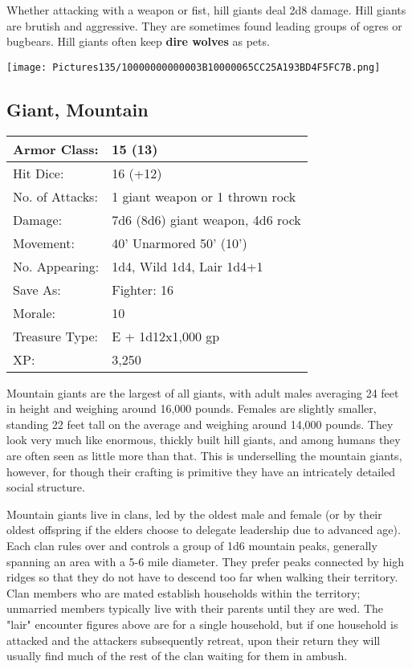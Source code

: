 \documentclass[a4paper,twoside,openany,10pt]{book}
\begin{document}
\begin{multicols}{2}
Whether attacking with a weapon or fist, hill giants deal 2d8 damage. Hill giants are brutish and aggressive. They are sometimes found leading groups of ogres or bugbears. Hill giants often keep \textbf{dire wolves} as pets.

\begin{center}
	\texttt{[image: Pictures135/10000000000003B10000065CC25A193BD4F5FC7B.png]}
\end{center}

\subsection*{Giant, Mountain}\label{giant-mountain}

\begin{tabularx}{0.48\textwidth}{@{}lX@{}}
Armor Class: & 15 (13) \\\hline
Hit Dice: & 16 (+12) \\\hline
No. of Attacks: & 1 giant weapon or 1 thrown rock \\\hline
Damage: & 7d6 (8d6) giant weapon, 4d6 rock \\\hline
Movement: & 40' Unarmored 50'
(10') \\\hline
No. Appearing: & 1d4, Wild 1d4, Lair 1d4+1 \\\hline
Save As: & Fighter: 16 \\\hline
Morale: & 10 \\\hline
Treasure Type: & E + 1d12x1,000 gp \\\hline
XP: & 3,250 \\\hline
\end{tabularx}\medskip

Mountain giants are the largest of all giants, with adult males averaging 24 feet in height and weighing around 16,000 pounds. Females are slightly smaller, standing 22 feet tall on the average and weighing around 14,000 pounds. They look very much like enormous, thickly built hill giants, and among humans they are often seen as little more than that. This is underselling the mountain giants, however, for though their crafting is primitive they have an intricately detailed social structure.

Mountain giants live in clans, led by the oldest male and female (or by their oldest offspring if the elders choose to delegate leadership due to advanced age). Each clan rules over and controls a group of 1d6 mountain peaks, generally spanning an area with a 5-6 mile diameter. They prefer peaks connected by high ridges so that they do not have to descend too far when walking their territory. Clan members who are mated establish households within the territory; unmarried members typically live with their parents until they are wed. The "lair" encounter figures above are for a single household, but if one household is attacked and the attackers subsequently retreat, upon their return they will usually find much of the rest of the clan waiting for them in ambush.


\end{multicols}
\end{document}
